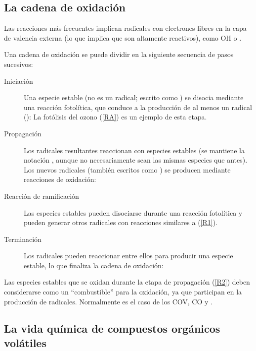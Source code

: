 \subsection{La cadena de oxidación}
Las reacciones más frecuentes implican radicales con electrones libres en la capa de valencia externa (lo que implica que son altamente reactivos), como OH o .

Una cadena de oxidación se puede dividir en la siguiente secuencia de pasos sucesivos:

\begin{description}
\item[Iniciación ] Una especie estable (no es un radical; escrito como ) se disocia mediante una reacción fotolítica, que conduce a la producción de al menos un radical ():
La fotólisis del ozono (\ref{RA}) es un ejemplo de esta etapa.
\item[Propagación ] Los radicales resultantes reaccionan con especies estables (se mantiene la notación , aunque no necesariamente sean las mismas especies que antes). Los nuevos radicales (también escritos como ) se producen mediante reacciones de oxidación:
\item[Reacción de ramificación]  Las especies estables pueden disociarse durante una reacción fotolítica y pueden generar otros radicales con reacciones similares a (\ref{R1}).
\item[Terminación ] Los radicales pueden reaccionar entre ellos para producir una especie estable, lo que finaliza la cadena de oxidación:

\end{description}

Las especies estables que se oxidan durante la etapa de propagación (\ref{R2}) deben considerarse como un “combustible” para la oxidación, ya que participan en la producción de radicales. Normalmente es el caso de los COV, CO y .

\subsection{La vida química de compuestos orgánicos volátiles}

